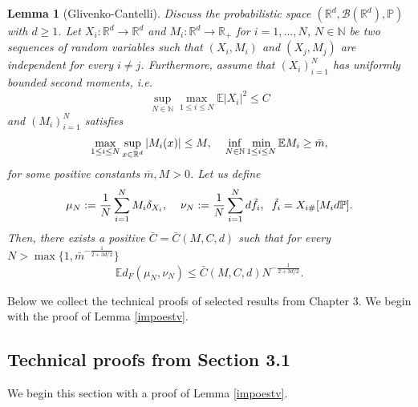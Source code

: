 \documentclass[10pt]{article}
\newtheorem{lemma}{Lemma}
\newcommand{\eqq}[2]{\begin{equation}  #1  \label{#2}\end{equation}    }
\newcommand{\hd}{\hspace{0.2cm}}
\newcommand{\R}{\mathbb{R}}
\newcommand{\p}{\mathbb{P}}
\begin{document}
\begin{lemma}[Glivenko-Cantelli]\label{GC}\cite[Lemma 5]{nasza}
Discuss the probabilistic space $(\R^d,\mathcal{B}(\R^d),\p)$ with  $d\geq 1$. Let $X_i:\mathbb{R}^d\rightarrow \mathbb{R}^d$ and $M_i:\mathbb{R}^d \rightarrow \mathbb{R}_{+}$ for $i=1,\dots,N$, $N \in \mathbb{N}$ be two sequences of random variables such that $(X_i,M_i)$ and $(X_j,M_j)$ are independent for every $i\neq j$. Furthermore, assume that $(X_i)_{i=1}^N$ has uniformly bounded second moments, i.e.
\eqq{\sup_{N \in \mathbb{N}}\max_{1\leq i \leq N} \mathbb{E}|X_i|^2 \leq C}{xas}
and $(M_i)_{i=1}^N$  satisfies 
\eqq{\max_{1\leq i \leq N} \sup_{x \in \R^d} |M_i(x)| \leq M, \hd \hd \inf_{N\in \mathbb{N}}\min_{1\leq i \leq N}\mathbb{E}M_i \geq \bar{m},}{mas}
for some positive constants $\bar{m},M > 0$. Let us define
\[
\mu_N := \frac{1}{N}\sum_{i=1}^N M_i\delta_{X_i}, \hd \hd \nu_N:= \frac{1}{N}\sum_{i=1}^N d\tilde{f}_i, \hd \tilde{f}_i = X_{i\#}[M_i d\mathbb{P}].
\]
Then, there exists a positive $\bar{C} = \bar{C}(M,C,d)$ such that for every $N > \max\{1,\bar{m}^{-\frac{1}{2+3d/2}}\} $
\[
\mathbb{E} d_{F}\left(\mu_N,\nu_N\right) \leq \bar{C}(M,C,d) N^{-\frac{1}{2+3d/2}}.
\]
\end{lemma}

Below we collect the technical proofs of selected results from Chapter 3. We begin with the proof of Lemma \ref{impoestv}.

\subsection{Technical proofs from Section 3.1 }

We begin this section with a proof of Lemma \ref{impoestv}.
\end{document}
